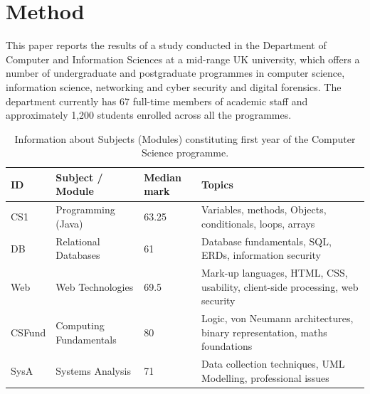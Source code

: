 \documentclass[sigconf]{acmart}
\begin{document}
\section {Method}
This paper reports the results of a study conducted in the Department of Computer and Information Sciences at a mid-range UK university, which offers a number of undergraduate and postgraduate programmes in computer science, information science, networking and cyber security and digital forensics. The department currently has 67 full-time members of academic staff and approximately 1,200 students enrolled across all the programmes.


\begin{table}[ht]
\caption{Information about Subjects (Modules) constituting first year of the Computer Science programme.}
\begin{tabular}{llll}
\hline
\textbf{ID} & \textbf{Subject / Module} & \textbf{Median mark} & \textbf{Topics} \\
\hline
CS1  & Programming (Java)         & 63.25        & Variables, methods, Objects, conditionals, loops, arrays          \\
DB  & Relational Databases       & 61        & Database fundamentals, SQL, ERDs, information security          \\
Web  & Web Technologies         & 69.5      & Mark-up languages, HTML, CSS, usability, client-side processing, web security          \\
CSFund  & Computing Fundamentals & 80        & Logic, von Neumann architectures, binary representation, maths foundations          \\
SysA  & Systems Analysis        & 71        & Data collection techniques, UML Modelling, professional issues                 
\end{tabular}
\label{tab:module_info}
\end{table}
\end{document}
